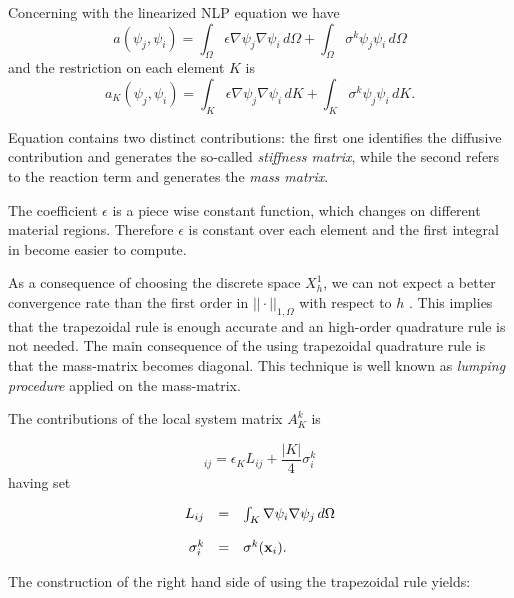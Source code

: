 Concerning with the linearized NLP equation we have
\begin{equation}
a(\psi_j,\psi_i)  = \int_{\Omega} \epsilon \nabla \psi_j \nabla \psi_i \, d\Omega + \int_{\Omega} \sigma^{k}\psi_j \psi_i \, d\Omega 
\end{equation}
and the restriction on each element $K$ is
\begin{equation}
\label{eq: bilinear local discrete}
a_K(\psi_j,\psi_i)  = \int_{K} \epsilon \nabla \psi_j \nabla \psi_i \, dK + \int_{K} \sigma^{k}\psi_j \psi_i \, dK .
\end{equation}

Equation  contains two distinct contributions: the first one identifies the diffusive contribution and generates the so-called \textit{stiffness matrix}, while the second refers to the reaction term and generates the \textit{mass matrix}.

The coefficient $\epsilon$ is a piece wise constant function, which changes on different material regions. Therefore $\epsilon$ is constant over each element and the first integral in  become easier to compute.

As a consequence of choosing the discrete space $X^1_{h}$,  we can not expect a better convergence rate than the first order in $||\cdot||_{1,\Omega}$ with respect to $h$ \cite{quarteroni:NumApprox}. This implies that the trapezoidal rule is enough accurate and an high-order quadrature rule is not needed. 
The main consequence of the using trapezoidal quadrature rule is that the mass-matrix becomes diagonal.
This technique is well known as \textit{lumping procedure} applied on the mass-matrix.

The contributions of the local system matrix $A_K^k$ is

\begin{equation}
[A_K^k]_{ij}  = \epsilon_K
L_{ij}
+
\dfrac{|K|}{4} \sigma^k_i
\end{equation}
having set

\begin{equation}
\begin{array}{rcl}
L_{ij} & = & \int_K \nabla \psi_i  \nabla \psi_j \, d\Omega \\ \\
\sigma^k_i & =  &\sigma^k(\mathbf{x}_i) .
\end{array}
\end{equation}

The construction of the right hand side of  using the trapezoidal rule yields:

